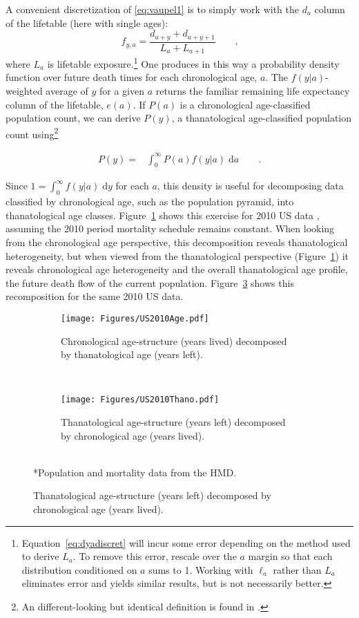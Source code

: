 \documentclass{article}
\newcommand{\dd}{\; \mathrm{d}}
\newcommand{\ec}{\quad\quad\text{,}}
\newcommand{\ep}{\quad\quad\text{.}}
\begin{document}
A convenient discretization of \eqref{eq:vaupel1} is to simply work with the
$d_a$ column of the lifetable (here with single ages):
\begin{equation}
\label{eq:dyadiscret}
f_{y, a} =  \frac{d_{a+y}+d_{a+y+1}}{L_a + L_{a+1}} \ec
\end{equation}
where $L_a$ is lifetable exposure.\footnote{Equation~\eqref{eq:dyadiscret}
will incur some error depending on the method used to derive $L_a$. To remove
this error, rescale over the $a$ margin so that each distribution conditioned on
$a$ sums to 1. Working with $\ell_a$ rather than $L_a$ eliminates error and
yields similar results, but is not necessarily better.} One produces in this way a probability density function over future death times for each chronological age,
$a$. The $f(y|a)$- weighted average of $y$ for a given $a$ returns the familiar
remaining life expectancy column of the lifetable, $e(a)$. If $P(a)$ is a
chronological age-classified population count, we can derive $P(y)$, a
thanatological age-classified population count using\footnote{An
different-looking but identical definition is found in
\citet{brouard1989mouvements}.}

\begin{align}
\label{eq:transform}
P(y) =& \int_0^\infty P(a) f(y | a) \dd a \ep
\end{align}

Since $1 = \int_0^\infty f(y|a) \dd y$ for each $a$,
this density is useful for decomposing data classified by chronological age,
such as the population pyramid, into thanatological age classes.
Figure~\ref{fig:USdecomp} shows this exercise for 2010 US data \citep{HMD},
assuming the 2010 period mortality schedule remains constant. When looking from the chronological age perspective, this decomposition reveals thanatological
heterogeneity, but when viewed from the thanatological perspective
(Figure~\ref{fig:USdecomp}) it reveals chronological age heterogeneity and the
overall thanatological age profile, the future death flow of the current
population.
Figure~\ref{fig:USrecomp} shows this recomposition for the same 2010
US data.

\begin{figure}[ht!]
	\caption{2010 US population structure}
	\begin{center}
	\begin{subfigure}{.45\textwidth}
		\caption{Chronological age-structure (years lived) decomposed by
		thanatological age (years left).}
		\label{fig:USdecomp}
		\texttt{[image: Figures/US2010Age.pdf]}
	\end{subfigure}
	~
	\begin{subfigure}{.45\textwidth}
		\caption{Thanatological age-structure (years left) decomposed by chronological
		age (years lived).}
		\label{fig:USrecomp}
		\texttt{[image: Figures/US2010Thano.pdf]}
	\end{subfigure}
	\\
	\small{*Population and mortality data from the HMD.}
	\end{center}
\end{figure}
\end{document}
